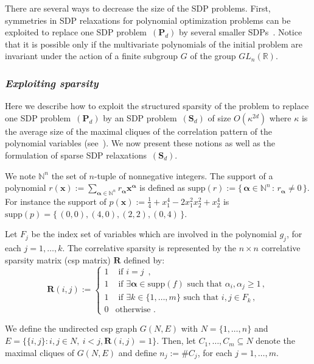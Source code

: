 \documentclass[preprint]{sigplanconf}
\newcommand{\suppf}[1]{\text{supp}(#1)}
\newcommand{\mons}[2]{\N_{#1}^{#2}}
\newcommand{\R}{\mathbb{R}}
\newcommand{\N}{\mathbb{N}}
\newcommand{\x}{\mathbf{x}}
\newcommand{\alphab}{\boldsymbol{\alpha}}
\def\P{\mathbf{P}}
\def\S{\mathbf{S}}
\def\S{\mathbf{S}}
\theoremstyle{plain}
\begin{document}
There are several ways to decrease the size of the SDP problems. 
First, symmetries in SDP relaxations for polynomial optimization problems can be exploited to replace one SDP problem~$(\P_d)$ by
several smaller SDPs~\cite{Riener2013SymmetricSDP}. Notice that it is possible only if the multivariate polynomials of the initial problem are invariant under the action of a finite subgroup $G$ of the group $GL_{n}(\R)$. 
%

\subsubsection*{\textit{Exploiting sparsity}} 
Here we describe how to exploit the structured sparsity of the
problem to replace one SDP problem~$(\P_d)$ by an SDP problem~$(\S_d)$ of
size $O (\kappa^ {2 d})$ where $\kappa$ is the average size
of the maximal cliques of the correlation pattern of the polynomial
variables (see~\cite{Waki06SparseSOS}). We now present these notions as well as the formulation of sparse SDP relaxations~$(\S_d)$.

We note $\N^n$ the set of $n$-tuple of nonnegative integers. The support of a polynomial $r(\x) := \sum_{\alphab \in \N^n} r_{\alphab} \x^{\alphab}$ is defined as $\suppf{r} := \{ \, \alphab \in \N^n \, : \, r_{\alphab} \neq 0 \, \}$. For instance the support of $p(\x) := \frac{1}{4} + x_1^4 - 2 x_1^2 x_2^2 + x_2^4$ is $\suppf{p} = \{ \, (0,0), (4, 0), (2,2), (0,4) \, \}$.

Let $F_j$ be the index set of variables which are involved in the polynomial $g_j$, for each $j=1, \dots, k$.
The correlative sparsity is represented by the 
$n \times n$ correlative sparsity matrix (csp matrix) $\mathbf{R}$ defined by:
\begin{equation*}
\label{eq:csp}
\mathbf{R}(i, j) := \left \{
\begin{array}{ll}
  1 & \text{ if }  i = j \enspace, \\
  1 & \text{ if }  \exists \alphab \in \suppf{f} \text{ such that } \alpha_i, \alpha_j \geq 1 \,, \\
  1 & \text{ if }  \exists k \in \{1, \dots, m\} \text{ such that } i, j \in F_k  \,,\\
  0 & \text{otherwise .} 
\end{array} \right.
\end{equation*}

We define the undirected csp graph $G(N, E)$ with
 $N = \{ 1, \dots, n \}$ and $E = \{\{i, j\} : i, j \in N , \ i < j , \mathbf{R}(i, j) = 1 \}$. 
Then, let $C_1,\dots, C_m \subseteq N$ denote the maximal cliques of $G(N, E)$ and 
 define $n_j := \#C_j$, for each $j=1 ,\dots,m$.
\end{document}
